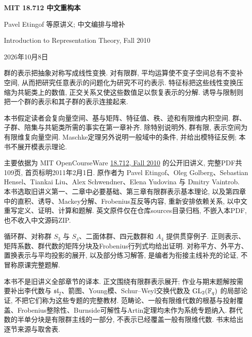 \frontmatter
\begin{center}
{\color{structurecolor}\bfseries\fontsize{18}{25}\selectfont\BookTitle\par}
{\bfseries MIT 18.712 中文重构本\par}
Pavel Etingof 等原讲义; 中文编排与增补\par
Introduction to Representation Theory, Fall 2010\par
2026年10月8日\par
\end{center}

\clearpage
\originalpreface
群的表示把抽象对称写成线性变换. 对有限群, 平均运算使不变子空间总有不变补空间, 从而把研究任意表示的问题化为研究不可约表示. 特征标把这些线性变换压缩为共轭类上的数值, 正交关系又使这些数值足以恢复表示的分解. 诱导与限制则把一个群的表示和其子群的表示连接起来.

本书假定读者会复向量空间、基与矩阵、特征值、秩、迹和有限维内积空间. 群、子群、陪集与共轭类所需的事实在第一章补齐. 除特别说明外, 群有限, 表示空间为有限维复向量空间. Maschke定理另外说明一般域中的条件, 并给出模特征反例; 本书不展开模表示理论.

主要依据为 MIT OpenCourseWare \href{https://ocw.mit.edu/courses/18-712-introduction-to-representation-theory-fall-2010/pages/lecture-notes/}{18.712, Fall 2010} 的公开旧讲义, 完整PDF共109页, 首页标明2011年2月1日. 原作者为 Pavel Etingof、Oleg Golberg、Sebastian Hensel、Tiankai Liu、Alex Schwendner、Elena Yudovina 与 Dmitry Vaintrob. 本书选取旧讲义第一、二章中必要基础、第三章有限群表示基本理论, 以及第四章中的直积、诱导、Mackey分解、Frobenius互反等内容, 重新安排依赖关系, 以中文重写定义、证明、计算和题解. 英文原件仅在仓库sources目录归档, 不嵌入本PDF, 也不收入中文源码ZIP.

循环群、对称群 $S_3$ 与 $S_4$、二面体群、四元数群和 $A_4$ 提供贯穿例子. 正则表示、矩阵系数、群代数的矩阵分块及Frobenius行列式均给出证明. 对称平方、外平方、置换表示与平均投影的展开, 以及部分练习解答, 是编者为衔接主线补充的论证, 不冒称原课完整题解.

本书不是旧讲义全部章节的译本. 正文围绕有限群表示展开; 作业与期末题解按需要补出李代数与 $\mathfrak{sl}_2$、箭图、Young模、Schur--Weyl交换代数及 $\operatorname{GL}_2(\mathbb F_q)$ 的局部论证, 不把它们称为这些专题的完整教材. 范畴论、一般有限维代数的根基与投射覆盖、Frobenius整除性、Burnside可解性与Artin定理均未作为系统专题纳入. 群代数的半单分块是有限群主线的一部分, 不表示已经覆盖一般有限维代数. 书末给出逐节来源与取舍表.


